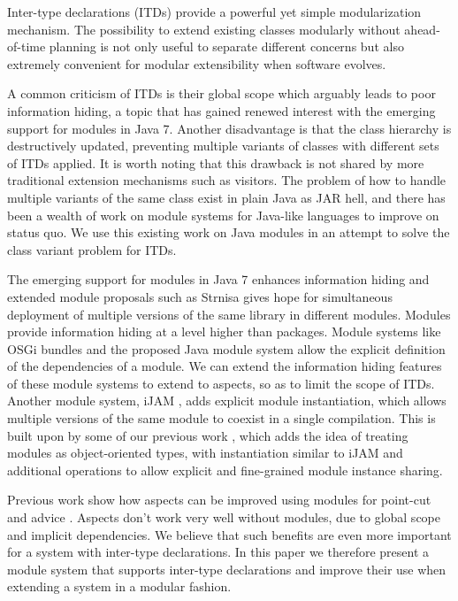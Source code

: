 Inter-type declarations (ITDs) provide a powerful yet simple modularization
mechanism. The possibility to extend existing classes modularly without
ahead-of-time planning is not only useful to separate different concerns
but also extremely convenient for modular extensibility when software
evolves.

A common criticism of ITDs is their global scope which arguably leads to
poor information hiding, a topic that has gained renewed interest with the 
emerging support for modules in Java 7. Another disadvantage is that the 
class hierarchy is destructively updated, preventing multiple variants of 
classes with different sets of ITDs applied. It is worth noting that 
this drawback is not shared by more traditional extension mechanisms such 
as visitors. The problem of how to handle multiple variants of the same 
class exist in plain Java as JAR hell, and there has been a wealth of work 
on module systems for Java-like languages to improve on status quo. We use 
this existing work on Java modules in an attempt to solve the class 
variant problem for ITDs.

The emerging support for modules in Java 7 enhances information hiding and
extended module proposals such as Strnisa gives hope for simultaneous
deployment of multiple versions of the same library in different modules.
Modules provide information hiding at a level higher than packages. Module
systems like OSGi bundles\cite{OSGi4} and the proposed Java module system\cite{JSR277}
allow the explicit definition of the dependencies of a module. We can extend
the information hiding features of these module systems to extend to aspects, 
so as to limit the scope of ITDs.
Another module system, iJAM \cite{iJAM}, adds explicit module instantiation, 
which allows multiple versions of the same module to coexist in a single compilation.
This is built upon by some of our previous work \cite{modulesastypes}, which 
adds the idea of treating modules as object-oriented types, with instantiation
similar to iJAM and additional operations to allow explicit and fine-grained
module instance sharing. 



Previous work show how aspects can be improved using modules for point-cut
and advice \cite{openmodulesaj}. Aspects don't work very well without 
modules, due to global scope and implicit dependencies. We believe that 
such benefits are even more important for a system with inter-type 
declarations. In this paper we therefore present a module system that 
supports inter-type declarations and improve their use when extending a 
system in a modular fashion.

